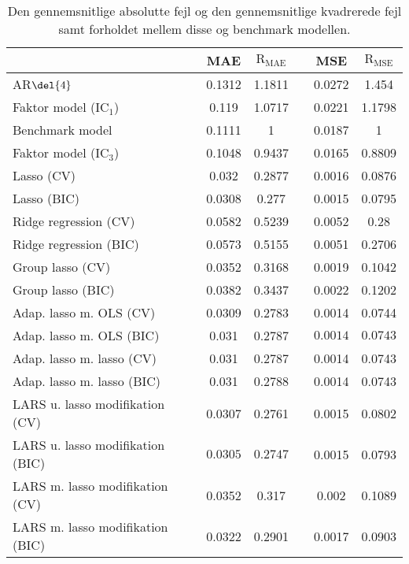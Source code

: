 \begin{table}[ht]
\center
\begin{tabular}{lccccc}
\toprule
 & MAE & \(\text{R}_{\text{MAE}}\) && MSE & \(\text{R}_{\text{MSE}}\) \\ \midrule
AR\(\del{4}\) & 0.1312 & 1.1811 && 0.0272 & 1.454 \\  
Faktor model (IC\(_1\)) & 0.119 & 1.0717 && 0.0221 & 1.1798 \\
Benchmark model & 0.1111 & 1 && 0.0187 & 1 \\
Faktor model (IC\(_3\)) & 0.1048 & 0.9437 && 0.0165 & 0.8809 \\
Lasso (CV) & 0.032 & 0.2877 && 0.0016 & 0.0876 \\
Lasso (BIC) & 0.0308 & 0.277 && 0.0015 & 0.0795 \\
Ridge regression (CV) & 0.0582 & 0.5239 && 0.0052 & 0.28 \\
Ridge regression (BIC) & 0.0573 & 0.5155 && 0.0051 & 0.2706 \\
Group lasso (CV) & 0.0352 & 0.3168 && 0.0019 & 0.1042  \\
Group lasso (BIC) & 0.0382 & 0.3437 && 0.0022 & 0.1202 \\
Adap. lasso m. OLS (CV) & 0.0309 & 0.2783 && 0.0014 & 0.0744 \\
Adap. lasso m. OLS (BIC) & 0.031 & 0.2787 && $\mathbf{0.0014}$ & $\mathbf{0.0743}$ \\
Adap. lasso m. lasso (CV) & 0.031 & 0.2787 && 0.0014 & 0.0743 \\
Adap. lasso m. lasso (BIC) & 0.031 & 0.2788 && 0.0014 & 0.0743 \\
LARS u. lasso modifikation (CV) &  0.0307 & 0.2761 && 0.0015 & 0.0802 \\
LARS u. lasso modifikation (BIC) & $\mathbf{0.0305}$ & $\mathbf{0.2747}$ && 0.0015 & 0.0793 \\
LARS m. lasso modifikation (CV) &  0.0352 & 0.317 && 0.002 & 0.1089 \\
LARS m. lasso modifikation (BIC) & 0.0322 & 0.2901 && 0.0017 & 0.0903 \\ \bottomrule
\end{tabular}
\caption{Den gennemsnitlige absolutte fejl og den gennemsnitlige kvadrerede fejl samt forholdet mellem disse og benchmark modellen.} \label{tab:mae_mse_vurdering}
\end{table}
